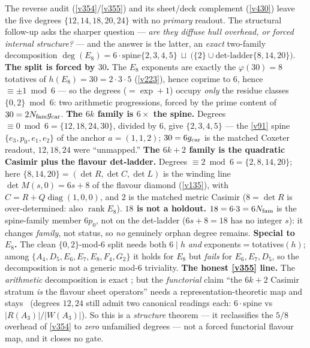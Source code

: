 \begin{winbox}
The reverse audit (\vref{v354}/\vref{v355}) and its sheet/deck complement (\vref{v430}) leave the five degrees $\{12,14,18,20,24\}$ with no \emph{primary} readout. The structural follow-up asks the sharper question --- \emph{are they diffuse hull overhead, or forced internal structure?} --- and the answer is the latter, an \emph{exact} two-family decomposition $\deg(E_8) = 6\cdot\text{spine}\{2,3,4,5\}\ \sqcup\ \big(\{2\}\cup\text{det-ladder}\{8,14,20\}\big)$. \textbf{The split is forced by $30$.} The $E_8$ exponents are exactly the $\varphi(30)=8$ totatives of $h(E_8)=30=2{\cdot}3{\cdot}5$ (\vref{v223}), hence coprime to $6$, hence $\equiv\pm1\bmod 6$ --- so the degrees ($=\exp+1$) occupy \emph{only} the residue classes $\{0,2\}\bmod 6$: two arithmetic progressions, forced by the prime content of $30=2N_{\mathrm{fam}}g_{\mathrm{car}}$. \textbf{The $6k$ family is $6\times$ the spine.} Degrees $\equiv0\bmod6=\{12,18,24,30\}$, divided by $6$, give $\{2,3,4,5\}$ --- the \vref{v91} spine $\{e_3,p_0,e_1,e_2\}$ of the anchor $a=(1,1,2)$; $30=6g_{\mathrm{car}}$ is the matched Coxeter readout, $12,18,24$ were ``unmapped.'' \textbf{The $6k{+}2$ family is the quadratic Casimir plus the flavour det-ladder.} Degrees $\equiv2\bmod6=\{2,8,14,20\}$; here $\{8,14,20\}=(\det R,\det C,\det L)$ is the winding line $\det M(s,0)=6s+8$ of the flavour diamond (\vref{v135}), with $C=R+Q\operatorname{diag}(1,0,0)$, and $2$ is the matched metric Casimir ($8=\det R$ is over-determined: also $\operatorname{rank}E_8$). \textbf{$18$ is not a holdout.} $18=6{\cdot}3=6N_{\mathrm{fam}}$ is the spine-family member $6p_0$, not on the det-ladder ($6s+8=18$ has no integer $s$): it changes \emph{family}, not status, so \emph{no} genuinely orphan degree remains. \textbf{Special to $E_8$.} The clean $\{0,2\}$-mod-$6$ split needs both $6\mid h$ \emph{and} exponents$=$totatives$(h)$; among $\{A_4,D_5,E_6,E_7,E_8,F_4,G_2\}$ it holds for $E_8$ but \emph{fails} for $E_6,E_7,D_5$, so the decomposition is not a generic mod-$6$ triviality. \textbf{The honest \vref{v355} line.} The \emph{arithmetic} decomposition is exact \mE; but the \emph{functorial} claim ``the $6k{+}2$ Casimir stratum \emph{is} the flavour sheet operators'' needs a representation-theoretic map and stays \mC\ (degrees $12,24$ still admit two canonical readings each: $6\cdot$spine vs $|R(A_3)|/|W(A_3)|$). So this is a \emph{structure} theorem --- it reclassifies the $5/8$ overhead of \vref{v354} to \emph{zero} unfamilied degrees --- not a forced functorial flavour map, and it closes no gate.
\end{winbox}


